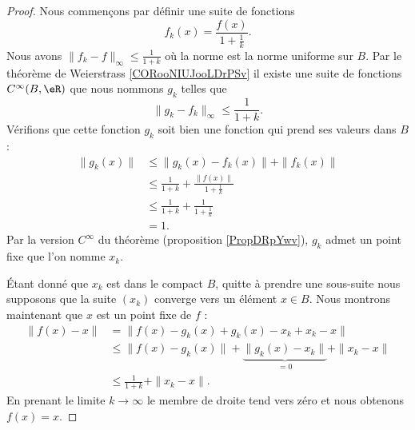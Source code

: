 \begin{proof}
    Nous commençons par définir une suite de fonctions
    \begin{equation}
        f_k(x)=\frac{ f(x) }{ 1+\frac{1}{ k } }.
    \end{equation}
    Nous avons \( \| f_k-f \|_{\infty}\leq \frac{1}{ 1+k }\) où la norme est la norme uniforme sur \( B\). Par le théorème de Weierstrass \ref{CORooNIUJooLDrPSv} il existe une suite de fonctions \(  C^{\infty}(B,\eR)\) que nous nommons \( g_k\) telles que
    \begin{equation}
        \|  g_k-f_k\|_{\infty}\leq\frac{1}{ 1+k }.
    \end{equation}
    Vérifions que cette fonction \( g_k\) soit bien une fonction qui prend ses valeurs dans \( B\) :
    \begin{subequations}
        \begin{align}
            \| g_k(x) \|&\leq \| g_k(x)-f_k(x) \|+\| f_k(x) \|\\
            &\leq \frac{1}{ 1+k }+\frac{ \| f(x) \| }{ 1+\frac{1}{ k } }\\
            &\leq \frac{1}{ 1+k}+\frac{1}{ 1+\frac{1}{ k } }\\
            &=1.
        \end{align}
    \end{subequations}
    Par la version \(  C^{\infty}\) du théorème (proposition \ref{PropDRpYwv}), \( g_k\) admet un point fixe que l'on nomme \( x_k\).

    Étant donné que \( x_k\) est dans le compact \( B\), quitte à prendre une sous-suite nous supposons que la suite \( (x_k)\) converge vers un élément \( x\in B\). Nous montrons maintenant que \( x\) est un point fixe de \( f\) :
    \begin{subequations}
        \begin{align}
            \| f(x)-x \|&=\| f(x)-g_k(x)+g_k(x)-x_k+x_k-x \|\\
            &\leq \| f(x)-g_k(x) \| +\underbrace{\| g_k(x)-x_k \|}_{=0}+\| x_k-x \|\\
            &\leq \frac{1}{ 1+k }+\| x_k-x \|.
        \end{align}
    \end{subequations}
    En prenant le limite \( k\to\infty\) le membre de droite tend vers zéro et nous obtenons \( f(x)=x\).
\end{proof}

